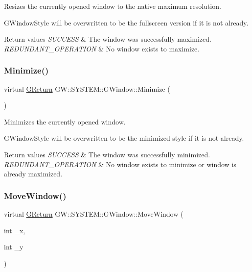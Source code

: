 Resizes the currently opened window to the native maximum resolution. 

G\+Window\+Style will be overwritten to be the fullscreen version if it is not already.


\begin{DoxyRetVals}{Return values}
{\em S\+U\+C\+C\+E\+SS} & The window was successfully maximized. \\
\hline
{\em R\+E\+D\+U\+N\+D\+A\+N\+T\+\_\+\+O\+P\+E\+R\+A\+T\+I\+ON} & No window exists to maximize. \\
\hline
\end{DoxyRetVals}
\mbox{\label{classGW_1_1SYSTEM_1_1GWindow_a2cced61a323dac10535904c3899563d8}} 
\subsubsection{\texorpdfstring{Minimize()}{Minimize()}}
{\footnotesize\ttfamily virtual \mbox{\hyperlink{namespaceGW_a67a839e3df7ea8a5c5686613a7a3de21}{G\+Return}} G\+W\+::\+S\+Y\+S\+T\+E\+M\+::\+G\+Window\+::\+Minimize (\begin{DoxyParamCaption}{ }\end{DoxyParamCaption})\hspace{0.3cm}{\ttfamily [pure virtual]}}



Minimizes the currently opened window. 

G\+Window\+Style will be overwritten to be the minimized style if it is not already.


\begin{DoxyRetVals}{Return values}
{\em S\+U\+C\+C\+E\+SS} & The window was successfully minimized. \\
\hline
{\em R\+E\+D\+U\+N\+D\+A\+N\+T\+\_\+\+O\+P\+E\+R\+A\+T\+I\+ON} & No window exists to minimize or window is already maximized. \\
\hline
\end{DoxyRetVals}
\mbox{\label{classGW_1_1SYSTEM_1_1GWindow_a9fc043b893f26c35e6ba965adcc17edb}} 
\subsubsection{\texorpdfstring{MoveWindow()}{MoveWindow()}}
{\footnotesize\ttfamily virtual \mbox{\hyperlink{namespaceGW_a67a839e3df7ea8a5c5686613a7a3de21}{G\+Return}} G\+W\+::\+S\+Y\+S\+T\+E\+M\+::\+G\+Window\+::\+Move\+Window (\begin{DoxyParamCaption}\item[{int}]{\+\_\+x,  }\item[{int}]{\+\_\+y }\end{DoxyParamCaption})\hspace{0.3cm}{\ttfamily [pure virtual]}}



